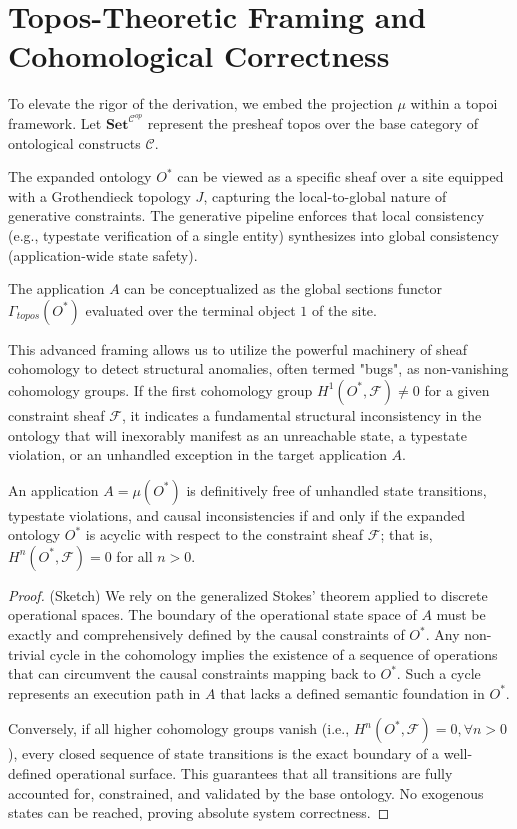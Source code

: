 \section{Topos-Theoretic Framing and Cohomological Correctness}

To elevate the rigor of the derivation, we embed the projection $\mu$ within a topoi framework. Let $\mathbf{Set}^{\mathcal{C}^{op}}$ represent the presheaf topos over the base category of ontological constructs $\mathcal{C}$.

The expanded ontology $O^*$ can be viewed as a specific sheaf over a site equipped with a Grothendieck topology $J$, capturing the local-to-global nature of generative constraints. The generative pipeline enforces that local consistency (e.g., typestate verification of a single entity) synthesizes into global consistency (application-wide state safety).

\begin{definition}
The application $A$ can be conceptualized as the global sections functor $\Gamma_{topos}(O^*)$ evaluated over the terminal object $1$ of the site.
\end{definition}

This advanced framing allows us to utilize the powerful machinery of sheaf cohomology to detect structural anomalies, often termed "bugs", as non-vanishing cohomology groups. If the first cohomology group $H^1(O^*, \mathcal{F}) \neq 0$ for a given constraint sheaf $\mathcal{F}$, it indicates a fundamental structural inconsistency in the ontology that will inexorably manifest as an unreachable state, a typestate violation, or an unhandled exception in the target application $A$.

\begin{theorem}
An application $A = \mu(O^*)$ is definitively free of unhandled state transitions, typestate violations, and causal inconsistencies if and only if the expanded ontology $O^*$ is acyclic with respect to the constraint sheaf $\mathcal{F}$; that is, $H^n(O^*, \mathcal{F}) = 0$ for all $n > 0$.
\end{theorem}

\begin{proof}
(Sketch) We rely on the generalized Stokes' theorem applied to discrete operational spaces. The boundary of the operational state space of $A$ must be exactly and comprehensively defined by the causal constraints of $O^*$. Any non-trivial cycle in the cohomology implies the existence of a sequence of operations that can circumvent the causal constraints mapping back to $O^*$. Such a cycle represents an execution path in $A$ that lacks a defined semantic foundation in $O^*$. 

Conversely, if all higher cohomology groups vanish (i.e., $H^n(O^*, \mathcal{F}) = 0, \forall n > 0$), every closed sequence of state transitions is the exact boundary of a well-defined operational surface. This guarantees that all transitions are fully accounted for, constrained, and validated by the base ontology. No exogenous states can be reached, proving absolute system correctness.
\end{proof}

